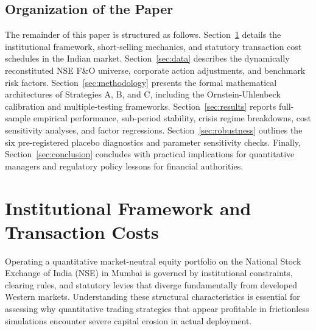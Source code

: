 \documentclass[11pt,a4paper]{article}
\begin{document}
\subsection{Organization of the Paper}
The remainder of this paper is structured as follows. Section~\ref{sec:microstructure} details the institutional framework, short-selling mechanics, and statutory transaction cost schedules in the Indian market. Section~\ref{sec:data} describes the dynamically reconstituted NSE F\&O universe, corporate action adjustments, and benchmark risk factors. Section~\ref{sec:methodology} presents the formal mathematical architectures of Strategies A, B, and C, including the Ornstein-Uhlenbeck calibration and multiple-testing frameworks. Section~\ref{sec:results} reports full-sample empirical performance, sub-period stability, crisis regime breakdowns, cost sensitivity analyses, and factor regressions. Section~\ref{sec:robustness} outlines the six pre-registered placebo diagnostics and parameter sensitivity checks. Finally, Section~\ref{sec:conclusion} concludes with practical implications for quantitative managers and regulatory policy lessons for financial authorities.

\section{Institutional Framework and Transaction Costs}
\label{sec:microstructure}

Operating a quantitative market-neutral equity portfolio on the National Stock Exchange of India (NSE) in Mumbai is governed by institutional constraints, clearing rules, and statutory levies that diverge fundamentally from developed Western markets. Understanding these structural characteristics is essential for assessing why quantitative trading strategies that appear profitable in frictionless simulations encounter severe capital erosion in actual deployment.
\end{document}
